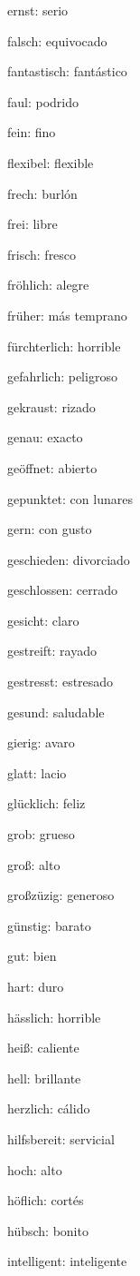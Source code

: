 \begin{multicols}{2}
\begin{myitemize}
\item ernst: serio
\item falsch: equivocado
\item fantastisch: fantástico
\item faul: podrido
\item fein: fino
\item flexibel: flexible
\item frech: burlón
\item frei: libre
\item frisch: fresco
\item fröhlich: alegre
\item früher: más temprano
\item fürchterlich: horrible
\item gefahrlich: peligroso
\item gekraust: rizado
\item genau: exacto
\item geöffnet: abierto
\item gepunktet: con lunares
\item gern: con gusto
\item geschieden: divorciado
\item geschlossen: cerrado
\item gesicht: claro
\item gestreift: rayado
\item gestresst: estresado
\item gesund: saludable
\item gierig: avaro
\item glatt: lacio
\item glücklich: feliz
\item grob: grueso
\item groß: alto
\item großzüzig: generoso
\item günstig: barato
\item gut: bien
\item hart: duro
\item hässlich: horrible
\item heiß: caliente
\item hell: brillante
\item herzlich: cálido
\item hilfsbereit: servicial
\item hoch: alto
\item höflich: cortés
\item hübsch: bonito
\item intelligent: inteligente

\end{myitemize}
\end{multicols}

